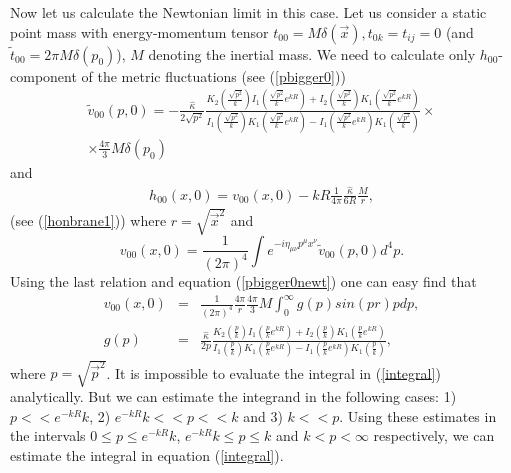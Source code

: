 \documentclass[a4paper,12pt]{article}
\begin{document}
Now let us calculate the Newtonian limit in this case. Let us consider
a static point mass with energy-momentum tensor
$t_{00}=M\delta(\vec x), t_{0k}=t_{ij}=0$ (and $\tilde t_{00}=2\pi
M \delta (p_0) $), $M$ denoting the inertial mass. We need to
calculate only $h_{00}$-component of the metric fluctuations (see
(\ref{pbigger0}))
\begin{eqnarray}\label{pbigger0newt}
\tilde
v_{00}(p,0)=-\frac{\hat\kappa}{2\sqrt{p^2}}\frac{K_2\left(\frac{\sqrt{p^2}}{k}\right)
I_1\left(\frac{\sqrt{p^2}}{k}e^{kR}\right)+I_2\left(\frac{\sqrt{p^2}}{k}\right)
K_1\left(\frac{\sqrt{p^2}}{k}e^{kR}\right)}{I_1\left(\frac{\sqrt{p^2}}{k}\right)
K_1\left(\frac{\sqrt{p^2}}{k}e^{kR}\right)-I_1\left(\frac{\sqrt{p^2}}{k}e^{kR}\right)
K_1\left(\frac{\sqrt{p^2}}{k}\right)}\times \\ \nonumber
\times\frac{4\pi}{3}M\delta (p_0)
\end{eqnarray}
and
\begin{eqnarray}
h_{00}(x,0)=v_{00}(x,0)-kR\frac{1}{4\pi}\frac{\hat\kappa}{6R}\frac{M}{r},
\end{eqnarray}
(see (\ref{honbrane1})) where $r=\sqrt{{\vec x}^2}$ and
\begin{equation}
v_{00}(x,0)=\frac{1}{(2\pi)^4}\int e^{-i\eta_{\mu\nu}p^\mu
x^\nu}\tilde v_{00}(p,0)d^4p.
\end{equation}
Using the last relation and equation (\ref{pbigger0newt}) one can
easy find that
\begin{eqnarray}\label{integral}
v_{00}(x,0)&=&\frac{1}{{(2\pi)}^4}\frac{4\pi}{{r}}\frac{4\pi}{3}M\int_0^\infty
g(p)sin(pr)p dp,\\
g(p)&=&\frac{\hat\kappa}{2p}\frac{K_2\left(\frac{p}{k}\right)
I_1\left(\frac{p}{k}e^{kR}\right)+I_2\left(\frac{p}{k}\right)
K_1\left(\frac{p}{k}e^{kR}\right)}{I_1\left(\frac{p}{k}\right)
K_1\left(\frac{p}{k}e^{kR}\right)-I_1\left(\frac{p}{k}e^{kR}\right)
K_1\left(\frac{p}{k}\right)}, \nonumber
\end{eqnarray}
where $p=\sqrt{{\vec p}^2}$. It is impossible to evaluate the integral
in (\ref{integral}) analytically. But we can estimate the integrand in the
following cases: 1) $p<<e^{-kR}k$, 2) $e^{-kR}k<<p<<k$ and 3) $k<<p$. Using
these estimates in the intervals $0\le p\le e^{-kR}k$, $e^{-kR}k\le p\le k$
and $k<p<\infty$ respectively, we can estimate the integral in equation
(\ref{integral}).
\end{document}
